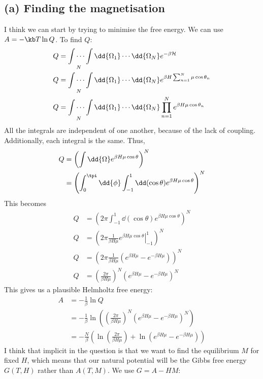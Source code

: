 \documentclass[../../PS3.tex]{subfiles}
\begin{document}
\subsection*{(a) Finding the magnetisation}
I think we can start by trying to minimise the free energy. We can use $A = -\kb T \ln{Q}$. To find $Q$:
\begin{align}
	Q &= \idotsint\limits_{N} \dd{\Omega_1} \dotsm  \dd{\Omega_N} e^{-\beta\ham} \\
	Q &= \idotsint\limits_{N} \dd{\Omega_1} \dotsm  \dd{\Omega_N} e^{\beta H \sum_{n = 1}^{N} \mu \cos{\theta_n}} \\
	Q &= \idotsint\limits_{N} \dd{\Omega_1} \dotsm  \dd{\Omega_N} \prod_{n=1}^{N} e^{\beta H\mu \cos{\theta_n}} 
\end{align}
All the integrals are independent of one another, because of the lack of coupling. Additionally, each integral is the same. Thus,
\begin{align}
	Q &= \left( \int \dd{\Omega}e^{\beta H\mu \cos{\theta}} \right)^{N} \\
	&= \left( \int_0^{\tpi} \dd{\phi} \int_{-1}^{1} \dd(\cos{\theta}) e^{\beta H\mu \cos{\theta}} \right)^{N}
\end{align}
This becomes
\begin{align}
	Q &= \left( 2 \pi \int_{-1}^{1} \dd(\cos{\theta}) e^{\beta H\mu \cos{\theta}} \right)^{N} \\
	Q &= \left( 2 \pi \frac{1}{\beta H \mu} \left. e^{\beta H\mu \cos{\theta}} \right|_{-1}^{1} \right)^{N} \\
	Q &= \left( 2 \pi \frac{1}{\beta H \mu} \left(e^{\beta H\mu} - e^{-\beta H \mu}\right) \right)^{N} \\ 
	Q &= \left( \frac{2 \pi }{\beta H \mu}\right)^N \left(e^{\beta H\mu} - e^{-\beta H \mu} \right)^{N} 
\end{align}
This gives us a plausible Helmholtz free energy:
\begin{align}
	A &= -\frac{1}{\beta} \ln{Q} \\
	&=  -\frac{1}{\beta} \ln(\left( \frac{2 \pi }{\beta H \mu}\right)^N \left(e^{\beta H\mu} - e^{-\beta H \mu} \right)^{N}) \\
	&= - \frac{N}{\beta} \left( \ln(\frac{2 \pi }{\beta H \mu}) + \ln(e^{\beta H\mu} - e^{-\beta H \mu} ) \right)
\end{align}
I think that implicit in the question is that we want to find the equilibrium $M$ for fixed $H$, which means that our natural potential will be the Gibbs free energy $G(T, H)$ rather than $A(T, M)$. We use $G = A - HM$:
\end{document}

